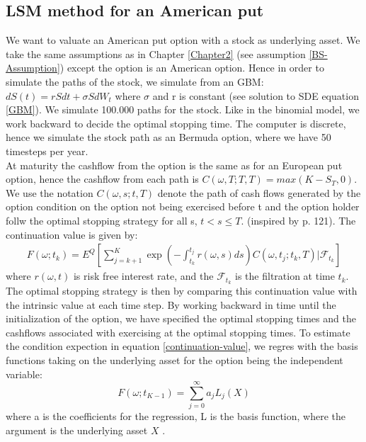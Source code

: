 \subsection{LSM method for an American put}           
We want to valuate an American put option with a stock as underlying asset. We take the same assumptions as in Chapter \ref{Chapter2} (see assumption \ref{BS-Assumption}) except the option is an American option. Hence in order to simulate the paths of the stock, we simulate from an GBM: $dS(t)=rSdt + \sigma S dW_t$ where $\sigma$ and r is constant (see solution to SDE equation \ref{GBM}). We simulate 100.000 paths for the stock. Like in the binomial model, we work backward to decide the optimal stopping time. The computer is discrete, hence we simulate the stock path as an Bermuda option, where we have 50 timesteps per year. \\

At maturity the cashflow from the option is the same as for an European put option, hence the cashflow from each path is $C(\omega,T;T, T)=max(K-S_T,0)$. We use the notation $C(\omega, s; t, T)$ denote the path of cash flows generated by the option condition on the option not being exercised before t and the option holder follw the optimal stopping strategy for all s, $t<s\leq T$.
(inspired by \parencite{lsm} p. 121). The continuation value is given by:
\begin{equation}\label{continuation-value}
\begin{split}
F(\omega; t_k)=E^Q[\sum_{j=k+1}^K \exp(-\int_{t_k}^{t_j} r(\omega,s) ds)C(\omega,t_j; t_k, T)|\mathcal{F}_{t_k}]
\end{split}
\end{equation}
where $r(\omega,t)$ is risk free interest rate, and the $\mathcal{F}_{t_k}$ is the filtration at time $t_k$.\\

The optimal stopping strategy is then by comparing this continuation value with the intrinsic value at each time step. By working backward in time until the initialization of the option, we have specified the optimal stopping times and the cashflows associated with exercising at the optimal stopping times. To estimate the condition expection in equation \ref{continuation-value}, we regres with the basis functions taking on the underlying asset for the option being the independent variable:
$$F(\omega;t_{K-1})= \sum_{j=0}^\infty a_j L_j(X)$$
where a is the coefficients for the regression, L is the basis function, where the argument is the underlying asset $X$ \parencite{lsm}.


